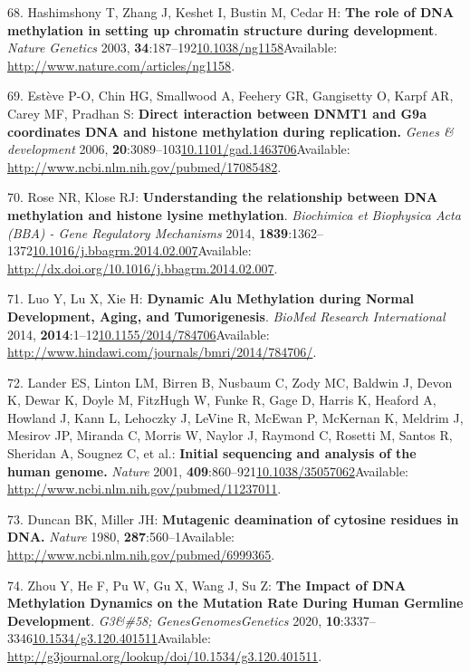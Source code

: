 \documentclass[
]{book}
\begin{document}
\leavevmode\hypertarget{ref-Hashimshony2003}{}%
68. Hashimshony T, Zhang J, Keshet I, Bustin M, Cedar H: \textbf{The role of DNA methylation in setting up chromatin structure during development}. \emph{Nature Genetics} 2003, \textbf{34}:187--192\href{https://doi.org/10.1038/ng1158}{10.1038/ng1158}Available: \url{http://www.nature.com/articles/ng1158}.

\leavevmode\hypertarget{ref-Esteve2006}{}%
69. Estève P-O, Chin HG, Smallwood A, Feehery GR, Gangisetty O, Karpf AR, Carey MF, Pradhan S: \textbf{Direct interaction between DNMT1 and G9a coordinates DNA and histone methylation during replication.} \emph{Genes \& development} 2006, \textbf{20}:3089--103\href{https://doi.org/10.1101/gad.1463706}{10.1101/gad.1463706}Available: \url{http://www.ncbi.nlm.nih.gov/pubmed/17085482}.

\leavevmode\hypertarget{ref-Rose2014}{}%
70. Rose NR, Klose RJ: \textbf{Understanding the relationship between DNA methylation and histone lysine methylation}. \emph{Biochimica et Biophysica Acta (BBA) - Gene Regulatory Mechanisms} 2014, \textbf{1839}:1362--1372\href{https://doi.org/10.1016/j.bbagrm.2014.02.007}{10.1016/j.bbagrm.2014.02.007}Available: \url{http://dx.doi.org/10.1016/j.bbagrm.2014.02.007}.

\leavevmode\hypertarget{ref-Luo2014}{}%
71. Luo Y, Lu X, Xie H: \textbf{Dynamic Alu Methylation during Normal Development, Aging, and Tumorigenesis}. \emph{BioMed Research International} 2014, \textbf{2014}:1--12\href{https://doi.org/10.1155/2014/784706}{10.1155/2014/784706}Available: \url{http://www.hindawi.com/journals/bmri/2014/784706/}.

\leavevmode\hypertarget{ref-Lander2001}{}%
72. Lander ES, Linton LM, Birren B, Nusbaum C, Zody MC, Baldwin J, Devon K, Dewar K, Doyle M, FitzHugh W, Funke R, Gage D, Harris K, Heaford A, Howland J, Kann L, Lehoczky J, LeVine R, McEwan P, McKernan K, Meldrim J, Mesirov JP, Miranda C, Morris W, Naylor J, Raymond C, Rosetti M, Santos R, Sheridan A, Sougnez C, et al.: \textbf{Initial sequencing and analysis of the human genome.} \emph{Nature} 2001, \textbf{409}:860--921\href{https://doi.org/10.1038/35057062}{10.1038/35057062}Available: \url{http://www.ncbi.nlm.nih.gov/pubmed/11237011}.

\leavevmode\hypertarget{ref-Duncan1980}{}%
73. Duncan BK, Miller JH: \textbf{Mutagenic deamination of cytosine residues in DNA.} \emph{Nature} 1980, \textbf{287}:560--1Available: \url{http://www.ncbi.nlm.nih.gov/pubmed/6999365}.

\leavevmode\hypertarget{ref-Zhou2020}{}%
74. Zhou Y, He F, Pu W, Gu X, Wang J, Su Z: \textbf{The Impact of DNA Methylation Dynamics on the Mutation Rate During Human Germline Development}. \emph{G3\&\#58; Genes\textbar Genomes\textbar Genetics} 2020, \textbf{10}:3337--3346\href{https://doi.org/10.1534/g3.120.401511}{10.1534/g3.120.401511}Available: \url{http://g3journal.org/lookup/doi/10.1534/g3.120.401511}.
\end{document}

